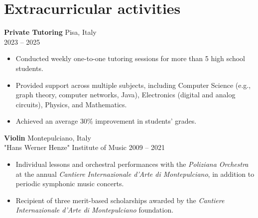 \documentclass[11pt]{article}
\newcommand{\entry}[4]{{{\textbf{#1}}} \hfill #3 \\ #2 \hfill #4}
\begin{document}
	\section{Extracurricular activities}
	\entry{Private Tutoring}{}{Pisa, Italy}{2023 -- 2025} \\
	\begin{itemize}[noitemsep,leftmargin=10.0mm,rightmargin=0mm,topsep=6pt]
		\item Conducted weekly one-to-one tutoring sessions for more than 5 high school students.
		\item Provided support across multiple subjects, including Computer Science (e.g., graph theory, computer networks, Java), Electronics (digital and analog circuits), Physics, and Mathematics.
		\item Achieved an average 30\% improvement in students' grades.
	\end{itemize}
	
	
	\smallskip
	
	\entry{Violin}{"Hans Werner Henze" Institute of Music}{Montepulciano, Italy}{2009 -- 2021} \\
	\begin{itemize}[noitemsep,leftmargin=10.0mm,rightmargin=0mm,topsep=6pt]
		\item Individual lessons and orchestral performances with the \textit{Poliziana Orchestra} at the annual \textit{Cantiere Internazionale d'Arte di Montepulciano}, in addition to periodic symphonic music concerts. 
		\item Recipient of three merit-based scholarships awarded by the \textit{Cantiere Internazionale d'Arte di Montepulciano} foundation.
	\end{itemize}
	
\end{document}
